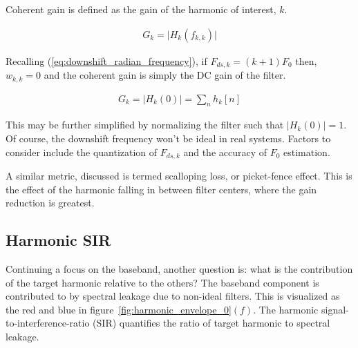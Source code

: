 \documentclass [11pt, proquest,oneside] {ganter_thesis}[2015/03/03]
\begin{document}
Coherent gain is defined as the gain of the harmonic of interest, $k$.

\begin{align}
G_k = \Big| H_k(f_{k,k}) \Big|
\end{align}

Recalling (\ref{eq:downshift_radian_frequency}), if $F_{ds,k} = (k+1)F_0$ then, $w_{k,k} = 0$ and the coherent gain is simply the DC gain of the filter.

\begin{align}
G_k = \Big| H_k(0) \Big| = \sum_n h_k[n]
\end{align}

This may be further simplified by normalizing the filter such that $\Big| H_k(0) \Big| = 1$.  Of course, the downshift frequency won't be ideal in real systems.  Factors to consider include the quantization of $F_{ds,k}$ and the accuracy of $F_0$ estimation.

A similar metric, discussed \cite{harris1978use} is termed scalloping loss, or picket-fence effect.  This is the effect of the harmonic falling in between filter centers, where the gain reduction is greatest.





\subsection{Harmonic SIR}

Continuing a focus on the baseband, another question is: what is the contribution of the target harmonic relative to the others?  The baseband component is contributed to by spectral leakage due to non-ideal filters.  This is visualized as the red and blue in figure~\ref{fig:harmonic_envelope_0}$(f)$.  The harmonic signal-to-interference-ratio (SIR) quantifies the ratio of target harmonic to spectral leakage.
\end{document}
